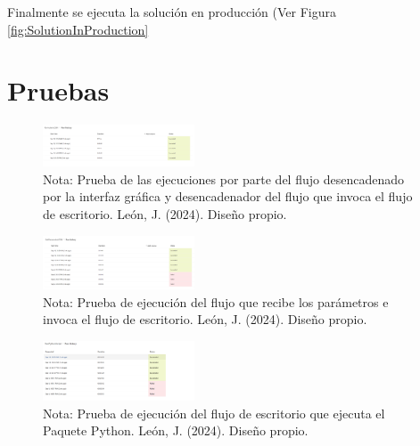 \documentclass[letter,oneside,12pt,spanish]{report}
\begin{document}
\noindent Finalmente se ejecuta la solución en producción (Ver Figura \ref{fig:SolutionInProduction}



\section{Pruebas}

\begin{figure}[ht]
    \centering
    \includegraphics[width=0.4\textwidth]{Figs/Pruebas - FormulacioCGN.png}
    \label{fig:FlowAPPPTest}
    \\Nota: Prueba de las ejecuciones por parte del flujo desencadenado por la interfaz gráfica y desencadenador del flujo que invoca el flujo de escritorio. León, J. (2024). Diseño propio.
\end{figure}

\begin{figure}[ht]
    \centering
    \includegraphics[width=0.4\textwidth]{Figs/Pruebas - GetParametersCGN.png}
    \label{fig:FlowCloudTest}
    \\Nota: Prueba de ejecución del flujo que recibe los parámetros e invoca el flujo de escritorio. León, J. (2024). Diseño propio.
\end{figure}  

\begin{figure}[ht]
    \centering
    \includegraphics[width=0.4\textwidth]{Figs/Pruebas - RunPythonScript.png}
    \label{fig:FlowDesktopTest}
    \\Nota: Prueba de ejecución del flujo de escritorio que ejecuta el Paquete Python. León, J. (2024). Diseño propio.
\end{figure} 
\end{document}
